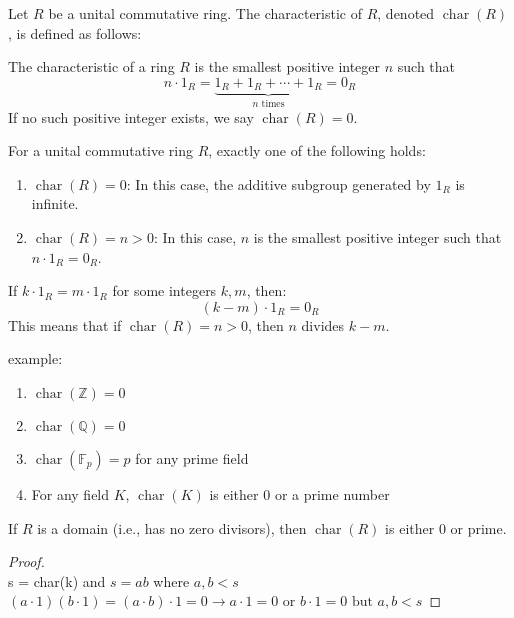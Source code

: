 \documentclass{article}
\begin{document}
        Let $R$ be a unital commutative ring. The characteristic of $R$, denoted $\operatorname{char}(R)$, is defined as follows:
        
        \begin{definition}
        The characteristic of a ring $R$ is the smallest positive integer $n$ such that
        \[ n \cdot 1_R = \underbrace{1_R + 1_R + \cdots + 1_R}_{n \text{ times}} = 0_R \]
        If no such positive integer exists, we say $\operatorname{char}(R) = 0$.
        \end{definition}
        
        \begin{proposition}
        For a unital commutative ring $R$, exactly one of the following holds:
        \begin{enumerate}
            \item $\operatorname{char}(R) = 0$: In this case, the additive subgroup generated by $1_R$ is infinite.
            \item $\operatorname{char}(R) = n > 0$: In this case, $n$ is the smallest positive integer such that $n \cdot 1_R = 0_R$.
        \end{enumerate}
        \end{proposition}
        
       
        If $k \cdot 1_R = m \cdot 1_R$ for some integers $k,m$, then:
        \[ (k-m) \cdot 1_R = 0_R \]
        This means that if $\operatorname{char}(R) = n > 0$, then $n$ divides $k-m$.
  
        
        example:
        \begin{enumerate}
            \item $\operatorname{char}(\mathbb{Z}) = 0$
            \item $\operatorname{char}(\mathbb{Q}) = 0$
            \item $\operatorname{char}(\mathbb{F}_p) = p$ for any prime field
            \item For any field $K$, $\operatorname{char}(K)$ is either $0$ or a prime number
        \end{enumerate}
      
        
        \begin{proposition}
        If $R$ is a domain (i.e., has no zero divisors), then $\operatorname{char}(R)$ is either $0$ or prime.
        \end{proposition}
\begin{proof}
    \leavevmode \\ 
    s = char(k) and $s = ab$ where $a,b <s$  \\ 
    $(a\cdot 1)(b\cdot 1) = (a\cdot b) \cdot 1 = 0 \rightarrow a\cdot 1 = 0 \text{ or } b\cdot 1 = 0 \text{ but } a,b < s$
\end{proof}
\end{document}
